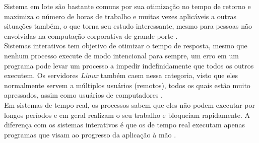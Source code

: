 Sistema em lote são bastante comuns por sua otimização no tempo de retorno e maximiza o número de horas de trabalho e muitas vezes aplicáveis a outras situações também, o que torna seu estudo interessante, mesmo para pessoas não envolvidas na computação corporativa de grande porte \cite{Tanenbaum2016}.\\
Sistemas interativos tem objetivo de otimizar o tempo de resposta, mesmo que nenhum processo execute de modo intencional para sempre, um erro em um programa pode levar um processo a impedir indefinidamente que todos os outros executem. Os servidores \emph{Linux} também caem nessa categoria, visto que eles normalmente servem a múltiplos usuários (remotos), todos os quais estão muito apressados, assim como usuários de computadores \cite{Tanenbaum2016}.\\
Em sistemas de tempo real, os processos sabem que eles não podem executar por longos períodos e em geral realizam o seu trabalho e bloqueiam rapidamente. A diferença com os sistemas interativos é que os de tempo real executam apenas programas que visam ao progresso da aplicação à mão \cite{Tanenbaum2016}.